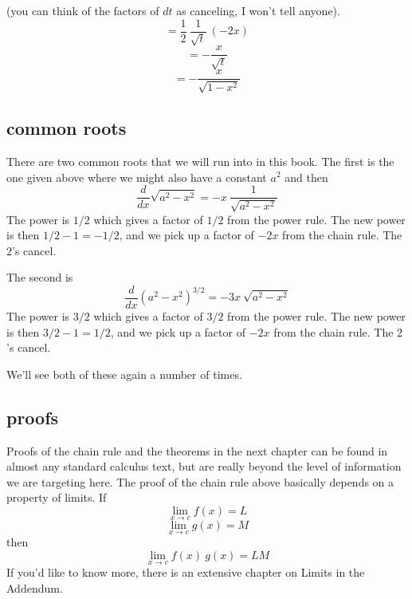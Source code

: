 \documentclass[11pt, oneside]{article}
\begin{document}
(you can think of the factors of $dt$ as canceling, I won't tell anyone).
\[ =  \frac{1}{2} \ \frac{1}{\sqrt{t}} \ (-2x) \]
\[ = - \frac{x}{\sqrt{t}} \] 
\[ = - \frac{x}{\sqrt{1-x^2}} \]

\subsection*{common roots}

There are two common roots that we will run into in this book.  The first is the one given above where we might also have a constant $a^2$ and then
\[ \frac{d}{dx} \sqrt{a^2 - x^2} =  - x \ \frac{1}{\sqrt{a^2 - x^2}} \]
The power is $1/2$ which gives a factor of $1/2$ from the power rule.  The new power is then $1/2-1 = -1/2$, and we pick up a factor of $-2x$ from the chain rule.  The $2$'s cancel.

The second is
\[ \frac{d}{dx} (a^2 - x^2)^{3/2} = -3x \ \sqrt{a^2 - x^2} \]
The power is $3/2$ which gives a factor of $3/2$ from the power rule.  The new power is then $3/2-1 = 1/2$, and we pick up a factor of $-2x$ from the chain rule.  The $2$'s cancel.

We'll see both of these again a number of times.

\subsection*{proofs}
Proofs of the chain rule and the theorems in the next chapter can be found in almost any standard calculus text, but are really beyond the level of information we are targeting here.  The proof of the chain rule above basically depends on a property of limits.  If
\[ \lim_{x \rightarrow c} f(x) = L \]
\[ \lim_{x \rightarrow c} g(x) = M \]
then
\[ \lim_{x \rightarrow c} f(x) \ g(x) = LM \]
If you'd like to know more, there is an extensive chapter on Limits in the Addendum.
\end{document}
